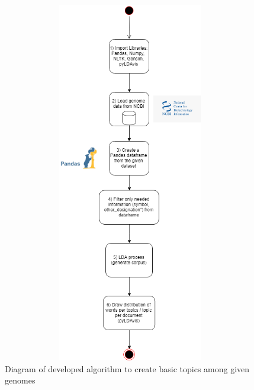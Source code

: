 \begin{figure}[htbp]
	\centering
	\includegraphics[width=1\textwidth, height=600px, keepaspectratio]{Image/LDA_preprocess.png}
	\caption{Diagram of developed algorithm to create basic topics among given genomes}
	\label{algorithm_figure}
\end{figure}

